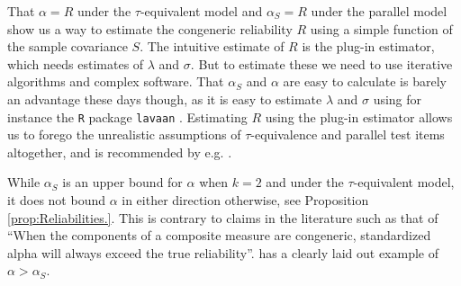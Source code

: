 \documentclass[twoside]{article}
\begin{document}
That $\alpha = R$ under the $\tau$-equivalent model and $\alpha_S = R$ under the parallel model show us a way to estimate the congeneric reliability $R$ using a simple function of the sample covariance $S$. The intuitive estimate of $R$ is the plug-in estimator, which needs estimates of $\lambda$ and $\sigma$. But to estimate these we need to use iterative algorithms and complex software. That $\alpha_S$ and $\alpha$ are easy to calculate is barely an advantage these days though, as it is easy to estimate $\lambda$ and $\sigma$ using for instance the \texttt{R} \citep{Team2013-tt} package \texttt{lavaan} \citep{Rosseel2012-yg}. Estimating $R$ using the plug-in estimator allows us to forego the unrealistic assumptions of $\tau$-equivalence and parallel test items altogether, and is recommended by e.g. \citet{McNeish2019-ea}.

\begin{rem}
While $\alpha_S$ is an upper bound for $\alpha$ when $k = 2$ and under the $\tau$-equivalent model, it does not bound $\alpha$ in either direction otherwise, see Proposition \ref{prop:Reliabilities.}. This is contrary to claims in the literature such as that of \citet[][p.348]{Osburn2000-jd} \enquote{When the components of a composite measure are congeneric, standardized alpha will always exceed the true reliability}. \citet[][p.450]{Falk2011-ae} has a clearly laid out example of $\alpha>\alpha_S$.
\end{rem}

\end{document}

